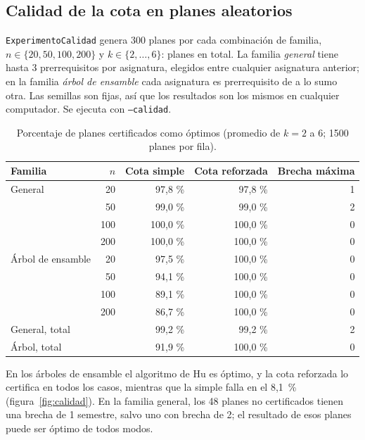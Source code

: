 \documentclass[11pt,letterpaper]{article}
\newcommand{\num}[1]{\pgfmathprintnumber[int detect]{#1}}
\begin{document}
\subsection{Calidad de la cota en planes aleatorios}\label{sec:calidad}
\texttt{ExperimentoCalidad} genera 300 planes por cada combinación de familia, $n \in \{20, 50, 100, 200\}$ y $k \in \{2, \dots, 6\}$: \num{12000} planes en total. La familia \emph{general} tiene hasta 3 prerrequisitos por asignatura, elegidos entre cualquier asignatura anterior; en la familia \emph{árbol de ensamble} cada asignatura es prerrequisito de a lo sumo otra. Las semillas son fijas, así que los resultados son los mismos en cualquier computador. Se ejecuta con \texttt{--calidad}.

\begin{table}[H]
\centering
\small
\caption{Porcentaje de planes certificados como óptimos (promedio de $k = 2$ a $6$; 1500 planes por fila).}
\label{tab:calidad}
\begin{tabular}{@{}l r r r r@{}}
\toprule
\textbf{Familia} & $n$ & \textbf{Cota simple} & \textbf{Cota reforzada} & \textbf{Brecha máxima} \\
\midrule
General & 20 & 97,8 \% & 97,8 \% & 1 \\
 & 50 & 99,0 \% & 99,0 \% & 2 \\
 & 100 & 100,0 \% & 100,0 \% & 0 \\
 & 200 & 100,0 \% & 100,0 \% & 0 \\
\addlinespace
Árbol de ensamble & 20 & 97,5 \% & 100,0 \% & 0 \\
 & 50 & 94,1 \% & 100,0 \% & 0 \\
 & 100 & 89,1 \% & 100,0 \% & 0 \\
 & 200 & 86,7 \% & 100,0 \% & 0 \\
\midrule
General, total & & 99,2 \% & 99,2 \% & 2 \\
Árbol, total & & 91,9 \% & 100,0 \% & 0 \\
\bottomrule
\end{tabular}
\end{table}

En los árboles de ensamble el algoritmo de Hu es óptimo, y la cota reforzada lo certifica en todos los casos, mientras que la simple falla en el 8,1~\% (figura~\ref{fig:calidad}). En la familia general, los 48 planes no certificados tienen una brecha de 1 semestre, salvo uno con brecha de 2; el resultado de esos planes puede ser óptimo de todos modos.
\end{document}
